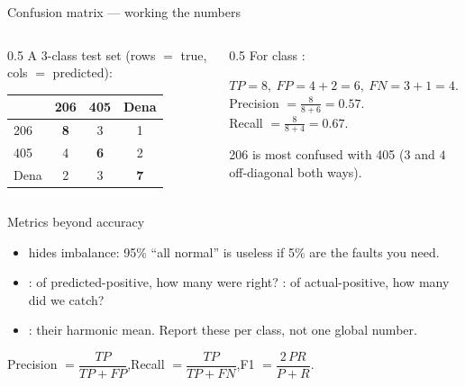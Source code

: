 \documentclass[10pt,aspectratio=169]{beamer}
\begin{document}
\begin{frame}{Confusion matrix — working the numbers}
  \begin{columns}[T]
    \begin{column}{0.5\textwidth}
      A $3$-class test set (rows $=$ true, cols $=$ predicted):
      \begin{center}
      \begin{tabular}{@{}l|ccc@{}}
        \toprule
         & \small 206 & \small 405 & \small Dena \\
        \midrule
        \small 206  & \textbf{8} & 3 & 1 \\
        \small 405  & 4 & \textbf{6} & 2 \\
        \small Dena & 2 & 3 & \textbf{7} \\
        \bottomrule
      \end{tabular}
      \end{center}
    \end{column}
    \begin{column}{0.5\textwidth}
      For class :
      \begin{mathbox}
        $TP=8,\ FP=4{+}2=6,\ FN=3{+}1=4$.\\[3pt]
        Precision $=\tfrac{8}{8+6}=0.57$.\\[2pt]
        Recall $=\tfrac{8}{8+4}=0.67$.
      \end{mathbox}
      206 is most confused with 405 ($3$ and $4$ off-diagonal both ways).
    \end{column}
  \end{columns}
\end{frame}

\begin{frame}{Metrics beyond accuracy}
  \begin{itemize}
    \item {} hides imbalance: 95\% ``all normal'' is useless if 5\% are the faults you need.
    \item {}: of predicted-positive, how many were right? : of actual-positive, how many did we catch?
    \item {}: their harmonic mean. Report these per class, not one global number.
  \end{itemize}
  \begin{mathbox}
    Precision $=\dfrac{TP}{TP+FP}$,\quad Recall $=\dfrac{TP}{TP+FN}$,\quad F1 $=\dfrac{2\,PR}{P+R}$.
  \end{mathbox}
\end{frame}
\end{document}
